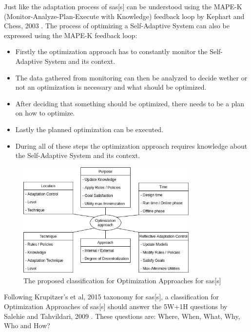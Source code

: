 \noindent Just like the adaptation process of \acrlong{sas}[s] can be understood using
the MAPE-K (Monitor-Analyze-Plan-Execute with Knowledge) feedback loop by Kephart and Chess, 2003 \cite*{VisionOfAutonomicComputing}.
The process of optimizing a Self-Adaptive System can also be expressed using the MAPE-K feedback loop:
\begin{itemize}[nosep]
    \item Firstly the optimization approach has to constantly monitor the Self-Adaptive System and its context.
    \item The data gathered from monitoring can then be analyzed to decide wether or not an optimization is necessary and what should be optimized.
    \item After deciding that something should be optimized, there needs to be a plan on how to optimize.
    \item Lastly the planned optimization can be executed.
    \item During all of these steps the optimization approach requires knowledge about the Self-Adaptive System and its context.
\end{itemize}

\begin{figure}[h]
    \centering
    \includegraphics[width=0.8\textwidth]{images/ClassificationProposal-WithDimensions.png}
    \caption{The proposed classification for Optimization Approaches for \acrlong{sas}[s]}
    \label{fig:Proposal}
\end{figure}

\noindent Following Krupitzer's et al, 2015 \cite*{SurveyOnEngineeringApproaches} taxonomy for \acrlong{sas}[s],
a classification for Optimization Approaches of \acrlong{sas}[s] should answer 
the 5W+1H questions by Salehie and Tahvildari, 2009 \cite*{LandscapeAndResearchChallenges}.
These questions are: Where, When, What, Why, Who and How?

